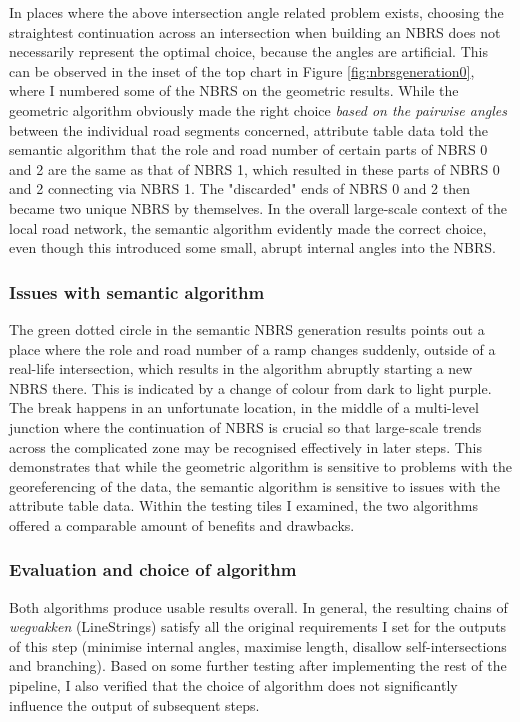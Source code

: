 In places where the above intersection angle related problem exists, choosing the straightest continuation across an intersection when building an NBRS does not necessarily represent the optimal choice, because the angles are artificial. This can be observed in the inset of the top chart in Figure \ref{fig:nbrsgeneration0}, where I numbered some of the NBRS on the geometric results. While the geometric algorithm obviously made the right choice \textit{based on the pairwise angles} between the individual road segments concerned, attribute table data told the semantic algorithm that the role and road number of certain parts of NBRS 0 and 2 are the same as that of NBRS 1, which resulted in these parts of NBRS 0 and 2 connecting via NBRS 1. The "discarded" ends of NBRS 0 and 2 then became two unique NBRS by themselves. In the overall large-scale context of the local road network, the semantic algorithm evidently made the correct choice, even though this introduced some small, abrupt internal angles into the NBRS.

\subsubsection{Issues with semantic algorithm}

The green dotted circle in the semantic NBRS generation results points out a place where the role and road number of a ramp changes suddenly, outside of a real-life intersection, which results in the algorithm abruptly starting a new NBRS there. This is indicated by a change of colour from dark to light purple. The break happens in an unfortunate location, in the middle of a multi-level junction where the continuation of NBRS is crucial so that large-scale trends across the complicated zone may be recognised effectively in later steps. This demonstrates that while the geometric algorithm is sensitive to problems with the georeferencing of the data, the semantic algorithm is sensitive to issues with the attribute table data. Within the testing tiles I examined, the two algorithms offered a comparable amount of benefits and drawbacks.

\subsubsection{Evaluation and choice of algorithm}

Both algorithms produce usable results overall. In general, the resulting chains of \textit{wegvakken} (LineStrings) satisfy all the original requirements I set for the outputs of this step (minimise internal angles, maximise length, disallow self-intersections and branching). Based on some further testing after implementing the rest of the pipeline, I also verified that the choice of algorithm does not significantly influence the output of subsequent steps.

